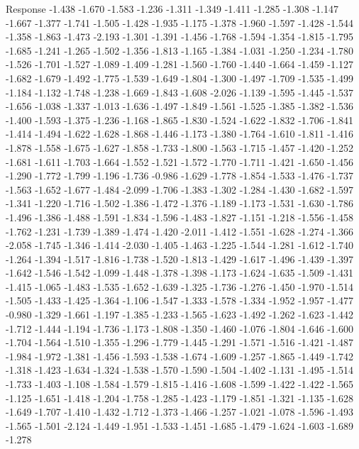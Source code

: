 \documentclass[9pt]{article}
\theoremstyle{plain}
\theoremstyle{definition}
\theoremstyle{remark}
\numberwithin{equation}{section}
\begin{document}
Response
-1.438
-1.670
-1.583
-1.236
-1.311
-1.349
-1.411
-1.285
-1.308
-1.147
-1.667
-1.377
-1.741
-1.505
-1.428
-1.935
-1.175
-1.378
-1.960
-1.597
-1.428
-1.544
-1.358
-1.863
-1.473
-2.193
-1.301
-1.391
-1.456
-1.768
-1.594
-1.354
-1.815
-1.795
-1.685
-1.241
-1.265
-1.502
-1.356
-1.813
-1.165
-1.384
-1.031
-1.250
-1.234
-1.780
-1.526
-1.701
-1.527
-1.089
-1.409
-1.281
-1.560
-1.760
-1.440
-1.664
-1.459
-1.127
-1.682
-1.679
-1.492
-1.775
-1.539
-1.649
-1.804
-1.300
-1.497
-1.709
-1.535
-1.499
-1.184
-1.132
-1.748
-1.238
-1.669
-1.843
-1.608
-2.026
-1.139
-1.595
-1.445
-1.537
-1.656
-1.038
-1.337
-1.013
-1.636
-1.497
-1.849
-1.561
-1.525
-1.385
-1.382
-1.536
-1.400
-1.593
-1.375
-1.236
-1.168
-1.865
-1.830
-1.524
-1.622
-1.832
-1.706
-1.841
-1.414
-1.494
-1.622
-1.628
-1.868
-1.446
-1.173
-1.380
-1.764
-1.610
-1.811
-1.416
-1.878
-1.558
-1.675
-1.627
-1.858
-1.733
-1.800
-1.563
-1.715
-1.457
-1.420
-1.252
-1.681
-1.611
-1.703
-1.664
-1.552
-1.521
-1.572
-1.770
-1.711
-1.421
-1.650
-1.456
-1.290
-1.772
-1.799
-1.196
-1.736
-0.986
-1.629
-1.778
-1.854
-1.533
-1.476
-1.737
-1.563
-1.652
-1.677
-1.484
-2.099
-1.706
-1.383
-1.302
-1.284
-1.430
-1.682
-1.597
-1.341
-1.220
-1.716
-1.502
-1.386
-1.472
-1.376
-1.189
-1.173
-1.531
-1.630
-1.786
-1.496
-1.386
-1.488
-1.591
-1.834
-1.596
-1.483
-1.827
-1.151
-1.218
-1.556
-1.458
-1.762
-1.231
-1.739
-1.389
-1.474
-1.420
-2.011
-1.412
-1.551
-1.628
-1.274
-1.366
-2.058
-1.745
-1.346
-1.414
-2.030
-1.405
-1.463
-1.225
-1.544
-1.281
-1.612
-1.740
-1.264
-1.394
-1.517
-1.816
-1.738
-1.520
-1.813
-1.429
-1.617
-1.496
-1.439
-1.397
-1.642
-1.546
-1.542
-1.099
-1.448
-1.378
-1.398
-1.173
-1.624
-1.635
-1.509
-1.431
-1.415
-1.065
-1.483
-1.535
-1.652
-1.639
-1.325
-1.736
-1.276
-1.450
-1.970
-1.514
-1.505
-1.433
-1.425
-1.364
-1.106
-1.547
-1.333
-1.578
-1.334
-1.952
-1.957
-1.477
-0.980
-1.329
-1.661
-1.197
-1.385
-1.233
-1.565
-1.623
-1.492
-1.262
-1.623
-1.442
-1.712
-1.444
-1.194
-1.736
-1.173
-1.808
-1.350
-1.460
-1.076
-1.804
-1.646
-1.600
-1.704
-1.564
-1.510
-1.355
-1.296
-1.779
-1.445
-1.291
-1.571
-1.516
-1.421
-1.487
-1.984
-1.972
-1.381
-1.456
-1.593
-1.538
-1.674
-1.609
-1.257
-1.865
-1.449
-1.742
-1.318
-1.423
-1.634
-1.324
-1.538
-1.570
-1.590
-1.504
-1.402
-1.131
-1.495
-1.514
-1.733
-1.403
-1.108
-1.584
-1.579
-1.815
-1.416
-1.608
-1.599
-1.422
-1.422
-1.565
-1.125
-1.651
-1.418
-1.204
-1.758
-1.285
-1.423
-1.179
-1.851
-1.321
-1.135
-1.628
-1.649
-1.707
-1.410
-1.432
-1.712
-1.373
-1.466
-1.257
-1.021
-1.078
-1.596
-1.493
-1.565
-1.501
-2.124
-1.449
-1.951
-1.533
-1.451
-1.685
-1.479
-1.624
-1.603
-1.689
-1.278
\end{document}
